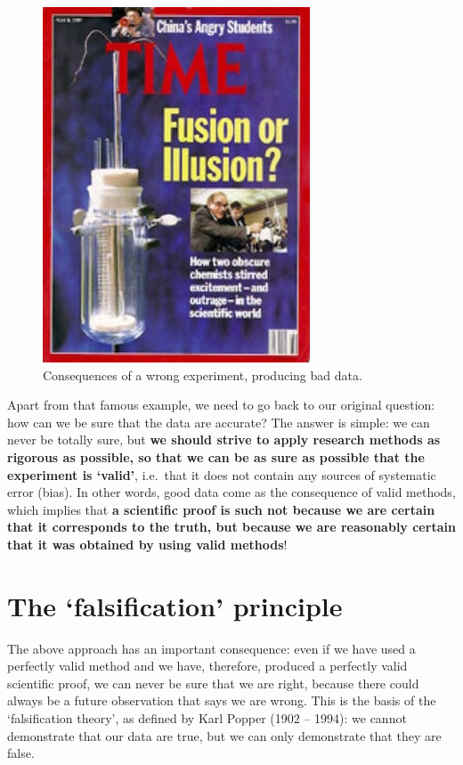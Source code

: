 \documentclass[a4paper,12pt,oneside]{book}
\begin{document}
\begin{figure}

{\centering \includegraphics[width=0.5\linewidth]{_images/FalseResults} 

}

\caption{Consequences of a wrong experiment, producing bad data.}\label{fig:figName2}
\end{figure}

Apart from that famous example, we need to go back to our original question: how can we be sure that the data are accurate? The answer is simple: we can never be totally sure, but \textbf{we should strive to apply research methods as rigorous as possible, so that we can be as sure as possible that the experiment is `valid'}, i.e.~that it does not contain any sources of systematic error (bias). In other words, good data come as the consequence of valid methods, which implies that \textbf{a scientific proof is such not because we are certain that it corresponds to the truth, but because we are reasonably certain that it was obtained by using valid methods}!

\hypertarget{the-falsification-principle}{%
\section{The `falsification' principle}\label{the-falsification-principle}}

The above approach has an important consequence: even if we have used a perfectly valid method and we have, therefore, produced a perfectly valid scientific proof, we can never be sure that we are right, because there could always be a future observation that says we are wrong. This is the basis of the `falsification theory', as defined by Karl Popper (1902 -- 1994): we cannot demonstrate that our data are true, but we can only demonstrate that they are false.
\end{document}
